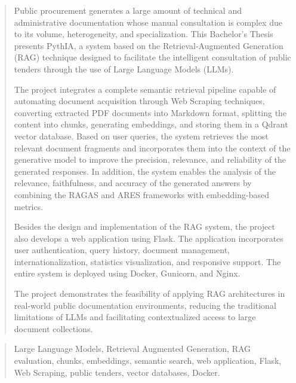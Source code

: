 \documentclass[a4paper,12pt,twoside]{memoir}
\begin{document}
\renewcommand*\abstractname{Abstract}
\begin{abstract}
Public procurement generates a large amount of technical and administrative documentation whose manual consultation is complex due to its volume, heterogeneity, and specialization. This Bachelor’s Thesis presents PythIA, a system based on the Retrieval-Augmented Generation (RAG) technique designed to facilitate the intelligent consultation of public tenders through the use of Large Language Models (LLMs).

The project integrates a complete semantic retrieval pipeline capable of automating document acquisition through Web Scraping techniques, converting extracted PDF documents into Markdown format, splitting the content into chunks, generating embeddings, and storing them in a Qdrant vector database. Based on user queries, the system retrieves the most relevant document fragments and incorporates them into the context of the generative model to improve the precision, relevance, and reliability of the generated responses. In addition, the system enables the analysis of the relevance, faithfulness, and accuracy of the generated answers by combining the RAGAS and ARES frameworks with embedding-based metrics.

Besides the design and implementation of the RAG system, the project also develops a web application using Flask. The application incorporates user authentication, query history, document management, internationalization, statistics visualization, and responsive support. The entire system is deployed using Docker, Gunicorn, and Nginx.

The project demonstrates the feasibility of applying RAG architectures in real-world public documentation environments, reducing the traditional limitations of LLMs and facilitating contextualized access to large document collections.
\end{abstract}

\renewcommand*\abstractname{Keywords}
\begin{abstract}
Large Language Models, Retrieval Augmented Generation, RAG evaluation, chunks, embeddings, semantic search, web application, Flask, Web Scraping, public tenders, vector databases, Docker.
\end{abstract}

\clearpage

\tableofcontents

\clearpage

\listoffigures

\clearpage

\listoftables
\clearpage

\mainmatter













\newenvironment{bottompar}{\par\vspace*{\fill}}{\clearpage}
\end{document}

